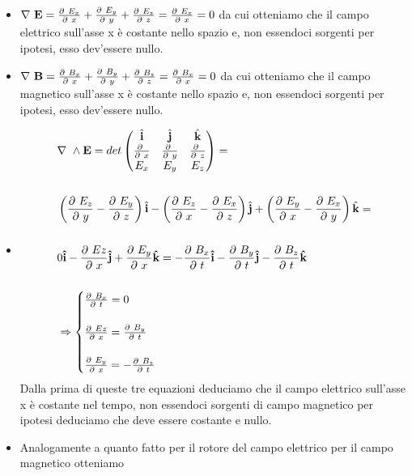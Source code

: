 \documentclass[
10pt, %
a4paper, %
oneside, %
headinclude,footinclude, %
BCOR5mm, %
]{scrartcl}
\begin{document}
\begin{itemize}
	\item \(\nabla\ \mathbf{E}=\frac{\partial\  E_x}{\partial\  x}+\frac{\partial\  E_y}{\partial\  y}+\frac{\partial\  E_z}{\partial\  z} =\frac{\partial\  E_x}{\partial\  x}=0\)
	da cui otteniamo che il campo elettrico sull'asse x è costante nello spazio e, non essendoci sorgenti per ipotesi, esso dev'essere nullo. 
	\item \(\nabla\ \mathbf{B}=\frac{\partial\  B_x}{\partial\  x}+\frac{\partial\  B_y}{\partial\  y}+\frac{\partial\  B_z}{\partial\  z} =\frac{\partial\  B_x}{\partial\  x}=0\)
	da cui otteniamo che il campo magnetico sull'asse x è costante nello spazio e, non essendoci sorgenti per ipotesi, esso dev'essere nullo. 
	\item 
	\begin{align*}
		&\nabla\ \wedge\mathbf{E}=det
		\begin{pmatrix}
			\hat{\mathbf{i}}&\hat{\mathbf{j}}&\hat{\mathbf{k}}\\
			\frac{\partial\ }{\partial\  x}&\frac{\partial\ }{\partial\  y}&\frac{\partial\ }{\partial\  z}\\
			E_x&E_y&E_z
		\end{pmatrix}=\\\\
		&\left(\frac{\partial\  E_z}{\partial\  y}-\frac{\partial\  E_y}{\partial\  z}\right)\hat{\mathbf{i}}
		-\left(\frac{\partial\  E_z}{\partial\  x}-\frac{\partial\  E_x}{\partial\  z}\right)\hat{\mathbf{j}}
		+\left(\frac{\partial\  E_y}{\partial\  x}-\frac{\partial\  E_x}{\partial\  y}\right)\hat{\mathbf{k}}=\\\\
		&0\mathbf{\hat{i}}-\frac{\partial\  Ez}{\partial\  x}\mathbf{\hat{j}}+ \frac{\partial\  E_y}{\partial\  x}\mathbf{\hat{k}}=-\frac{\partial\  B_x}{\partial\  t}\mathbf{\hat{i}} - \frac{\partial\  B_y}{\partial\  t}\mathbf{\hat{j}} -\frac{\partial\  B_z}{\partial\  t}\mathbf{\hat{k}}\\\\
		&\Rightarrow
		\begin{cases}
			\frac{\partial\  B_x}{\partial\  t} = 0\\\\
			\frac{\partial\  Ez}{\partial\  x} = \frac{\partial\  B_y}{\partial\  t}\\\\
			\frac{\partial\  E_y}{\partial\  x} = -\frac{\partial\  B_z}{\partial\  t}
		\end{cases}
		\end{align*}
	Dalla prima di queste tre equazioni deduciamo che il campo elettrico sull'asse x è costante nel tempo, non essendoci sorgenti di campo magnetico per ipotesi deduciamo che deve essere costante e nullo. 
	\item Analogamente a quanto fatto per il rotore del campo elettrico per il campo magnetico otteniamo 
	\begin{align*}

\end{align*}
\end{itemize}
\end{document}
